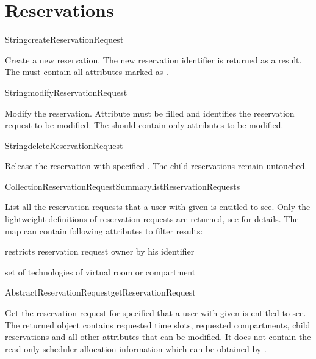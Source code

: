 \section{Reservations}

\begin{Api}

\begin{ApiCmd}{String}{createReservationRequest}%
%
%
\end{ApiCmd}
Create a new reservation. The new reservation identifier is returned as a result. The  must contain all attributes marked as \ApiRequired.

\begin{ApiCmd}{String}{modifyReservationRequest}%
%
%
\end{ApiCmd}
Modify the reservation. Attribute  must be filled and identifies the reservation request to be modified. The  should contain only attributes to be modified.

\begin{ApiCmd}{String}{deleteReservationRequest}%
%
%
\end{ApiCmd}
Release the reservation with specified . The child reservations remain untouched.

\begin{ApiCmdCollection}{Collection}{ReservationRequestSummary}{listReservationRequests}%
%
%
\end{ApiCmdCollection}
List all the reservation requests that a user with given  is entitled to see. Only the lightweight definitions of reservation requests are returned, see  for details. The  map can contain following attributes to filter results:
\begin{compactitem}
\item {} restricts reservation request owner by his identifier
\item {} set of technologies of virtual room or compartment
\end{compactitem}

\begin{ApiCmd}{AbstractReservationRequest}{getReservationRequest}%
%
%
\end{ApiCmd}
Get the reservation request for specified  that a user with given  is entitled to see. The returned object contains requested time slots, requested compartments, child reservations and all other attributes that can be modified. It does not contain the read only scheduler allocation information which can be obtained by .


\end{Api}
